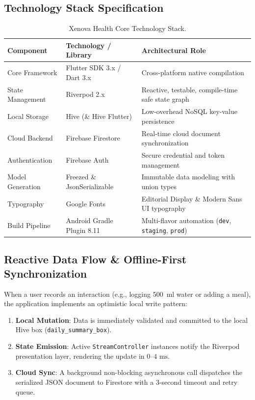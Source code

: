 \documentclass[12pt,a4paper]{article}
\begin{document}
\subsection{Technology Stack Specification}
\begin{table}[H]
\centering
\small
\begin{tabularx}{\textwidth}{@{}l p{4.2cm} X@{}}
\toprule
\textbf{Component} & \textbf{Technology / Library} & \textbf{Architectural Role} \\ \midrule
Core Framework & Flutter SDK 3.x / Dart 3.x & Cross-platform native compilation \\
State Management & Riverpod 2.x & Reactive, testable, compile-time safe state graph \\
Local Storage & Hive (\& Hive Flutter) & Low-overhead NoSQL key-value persistence \\
Cloud Backend & Firebase Firestore & Real-time cloud document synchronization \\
Authentication & Firebase Auth & Secure credential and token management \\
Model Generation & Freezed \& JsonSerializable & Immutable data modeling with union types \\
Typography & Google Fonts & Editorial Display \& Modern Sans UI typography \\
Build Pipeline & Android Gradle Plugin 8.11 & Multi-flavor automation (\texttt{dev}, \texttt{staging}, \texttt{prod}) \\
\bottomrule
\end{tabularx}
\caption{Xenova Health Core Technology Stack.}
\label{tab:tech_stack}
\end{table}

\subsection{Reactive Data Flow \& Offline-First Synchronization}
When a user records an interaction (e.g., logging 500~ml water or adding a meal), the application implements an optimistic local write pattern:
\begin{enumerate}[leftmargin=1.5em]
    \item \textbf{Local Mutation}: Data is immediately validated and committed to the local Hive box (\texttt{daily\_summary\_box}).
    \item \textbf{State Emission}: Active \texttt{StreamController} instances notify the Riverpod presentation layer, rendering the update in $0\text{--}4\text{ ms}$.
    \item \textbf{Cloud Sync}: A background non-blocking asynchronous call dispatches the serialized JSON document to Firestore with a 3-second timeout and retry queue.
\end{enumerate}
\end{document}
